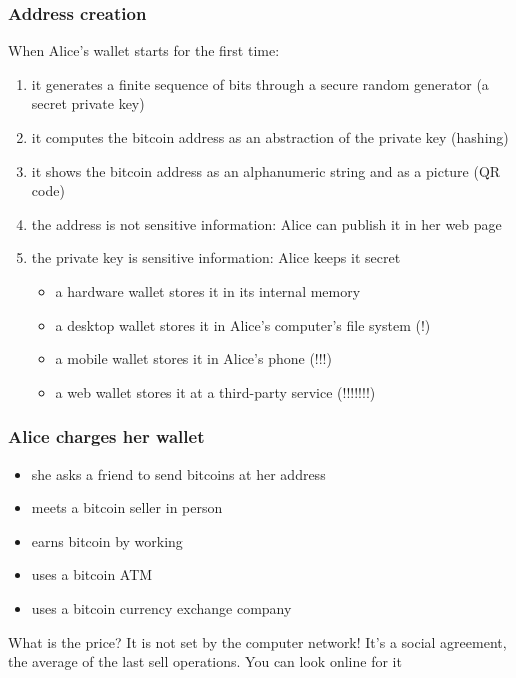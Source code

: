 \documentclass[11pt]{beamer}  %
\begin{document}
\begin{frame}\frametitle{Address creation}

  When Alice's wallet starts for the first time:

  \begin{enumerate}
  \item it generates a finite sequence of bits through a secure random generator
    (a secret private key)
  \item it computes the bitcoin address as an abstraction of the private key
    (hashing)
  \item it shows the bitcoin address as an alphanumeric string and as a picture (QR code)
  \item \alert{the address is not sensitive information}: Alice can publish it in her web page
  \item \alert{the private key is sensitive information}: Alice keeps it secret
    \begin{itemize}
    \item a hardware wallet stores it in its internal memory
    \item a desktop wallet stores it in Alice's computer's file system (!)
    \item a mobile wallet stores it in Alice's phone (!!!)
    \item a web wallet stores it at a third-party service (!!!!!!!)
    \end{itemize}
  \end{enumerate}
\end{frame}

\begin{frame}\frametitle{Alice charges her wallet}
  \begin{itemize}
  \item she asks a friend to send bitcoins at her address
  \item meets a bitcoin seller in person
  \item earns bitcoin by working
  \item uses a bitcoin ATM
  \item uses a bitcoin currency exchange company
  \end{itemize}

  \bigskip

  \begin{greenbox}{What is the price?}
    It is not set by the computer network! It's a social
    agreement, the average of the last sell operations.
    You can look online for it
  \end{greenbox}

\end{frame}
\end{document}
